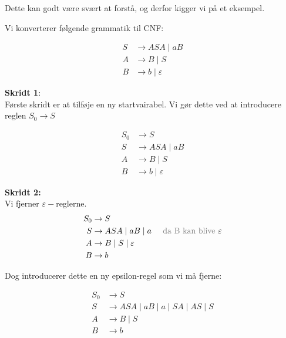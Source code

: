 Dette kan godt være svært at forstå, og derfor kigger vi på et eksempel.

\begin{example}
  Vi konverterer følgende grammatik til CNF:

\begin{equation*}
\begin{split}
  S &\rightarrow ASA\;|\;aB \\
  A &\rightarrow B\;|\;S \\
B &\rightarrow b\;|\; \varepsilon
\end{split}
\end{equation*}

\noindent
\textbf{\large Skridt 1}:\\
\noindent
Første skridt er at tilføje en ny startvairabel. Vi gør dette ved at introducere reglen $S_{0} \rightarrow S$

\begin{equation*}
\begin{split}
  S_{0} &\rightarrow S\\
  S &\rightarrow ASA \;|\; aB\\
  A &\rightarrow B \;|\; S\\
  B &\rightarrow b \;|\; \varepsilon
\end{split}
\end{equation*}

\noindent
\textbf{\large Skridt 2:}\\
\noindent
Vi fjerner $\varepsilon-$reglerne.
\begin{equation*}
\begin{split}
  S_{0} &\rightarrow S\\
  S &\rightarrow ASA \;|\; aB \;|\; a\;\;\;\;\; \text{\color{gray}da B kan blive }\varepsilon\\
  A &\rightarrow B \;|\; S \; | \; \varepsilon\\
  B &\rightarrow b
\end{split}
\end{equation*}

\noindent
Dog introducerer dette en ny epsilon-regel som vi må fjerne:


\begin{equation*}
\begin{split}
  S_{0} &\rightarrow S\\
  S &\rightarrow ASA \;|\; aB \;|\; a \;| \;SA \;| \;AS \;| \;S\\
  A &\rightarrow B \;|\; S \\
  B &\rightarrow b
\end{split}
\end{equation*}


\end{example}
